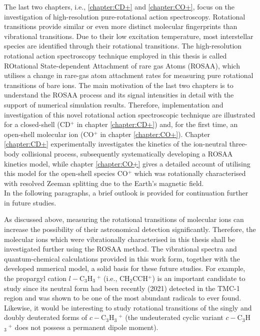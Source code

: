 The last two chapters, i.e., \ref{chapter:CD+} and \ref{chapter:CO+}, focus on the investigation of high-resolution 
pure-rotational action spectroscopy. Rotational transitions provide similar or even more distinct molecular 
fingerprints than vibrational transitions. Due to their low excitation temperature, most interstellar species are 
identified through their rotational transitions. The high-resolution rotational action spectroscopy technique employed 
in this thesis is called ROtational State-dependent Attachment of rare gas Atoms (ROSAA), which utilises a change in 
rare-gas atom attachment rates for measuring pure rotational transitions of bare ions. The main motivation of the last 
two chapters is to understand the ROSAA process and its signal intensities in detail with the support of numerical 
simulation results. Therefore, implementation and investigation of this novel rotational action spectroscopic technique 
are illustrated for a closed-shell (CD$^+$ in chapter \ref{chapter:CD+}) and, for the first time, an open-shell 
molecular ion (CO$^+$ in chapter \ref{chapter:CO+}). Chapter \ref{chapter:CD+} experimentally investigates the kinetics 
of the ion-neutral three-body collisional process, subsequently systematically developing a ROSAA kinetics model, while 
chapter \ref{chapter:CO+} gives a detailed account of utilising this model for the open-shell species CO$^+$ which was 
rotationally characterised with resolved Zeeman splitting due to the Earth's magnetic field.\\


In the following paragraphs, a brief outlook is provided for continuation further in future studies.

As discussed above, measuring the rotational transitions of molecular ions can increase the possibility of their astronomical detection significantly. Therefore, the molecular ions which were vibrationally characterised in this thesis shall be investigated further using the ROSAA method. The vibrational spectra and quantum-chemical calculations provided in this work form, together with the developed numerical model, a solid basis for these future studies. For example, the propargyl cation $l-$C$_3$H$_3\ ^+$ (i.e., CH$_2$CCH$^+$) is an important candidate to study since its neutral form had been recently (2021) detected in the TMC-1 region and was shown to be one of the most abundant radicals to ever found. Likewise, it would be interesting to study rotational transitions of the singly and doubly deuterated forms of $c-$C$_3$H$_3\ ^+$ (the undeuterated cyclic variant $c-$C$_3$H$_3\ ^+$ does not possess a permanent dipole moment).

